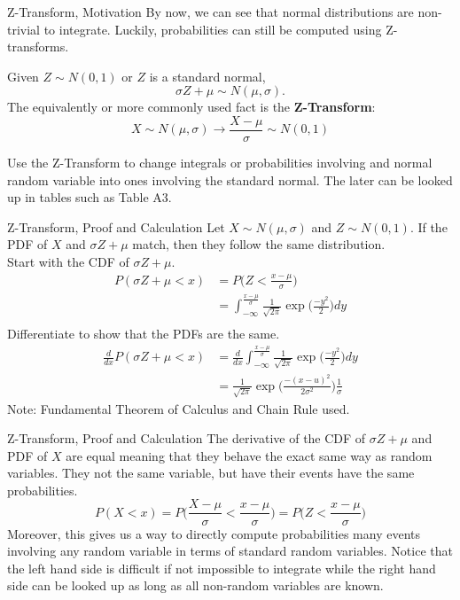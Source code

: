 \documentclass[handout]{beamer}
\newcommand{\nl}[1]{\vspace{#1 em}}
\begin{document}
\begin{frame}{Z-Transform, Motivation}
    By now, we can see that normal distributions are non-trivial to integrate. Luckily, probabilities can still be computed using Z-transforms.
    \begin{block}{}
        Given $Z \sim N(0,1)$ or $Z$ is a standard normal,
        $$\sigma Z + \mu  \sim N(\mu,\sigma).$$
        The equivalently or more commonly used fact is the \textbf{Z-Transform}:
        $$ X\sim N(\mu,\sigma) \to \frac{X-\mu}{\sigma} \sim N(0,1) $$
    \end{block}
    Use the Z-Transform to change integrals or probabilities involving and normal random variable into ones involving the standard normal. The later can be looked up in tables such as Table A3.
\end{frame}
\begin{frame}{Z-Transform, Proof and Calculation}
    Let $X \sim N(\mu,\sigma)$ and $Z\sim N(0,1)$. If the PDF of $X$ and $\sigma Z + \mu$ match, then they follow the same distribution.\\ \nl{0.5}
    Start with the CDF of $\sigma Z + \mu$.
\begin{align*} 
    P(\sigma Z + \mu < x)  & = P\bigg(Z < \frac{x-\mu}{\sigma}\bigg) \\
    &= \int_{-\infty}^{\frac{x-\mu}{\sigma}} \frac{1}{\sqrt{2 \pi}} \exp \bigg( \frac{-y^2}{2}\bigg) dy\\
\end{align*}
\pause Differentiate to show that the PDFs are the same.
\pause \begin{align*} 
    \frac{d}{dx}P(\sigma Z + \mu < x)  & = \frac{d}{dx}\int_{-\infty}^{\frac{x-\mu}{\sigma}} \frac{1}{\sqrt{2 \pi}} \exp \bigg( \frac{-y^2}{2}\bigg) dy\\
    & = \frac{1}{\sqrt{2 \pi}} \exp \bigg( \frac{-(x-u)^2}{2\sigma^2}\bigg) \frac{1}{\sigma}
\end{align*}
Note: Fundamental Theorem of Calculus and Chain Rule used.
\end{frame}
\begin{frame}{Z-Transform, Proof and Calculation}
    The derivative of the CDF of $\sigma Z + \mu$ and PDF of $X$ are equal meaning that they behave the exact same way as random variables. They not the same variable, but have their events have the same probabilities.
    $$ P(X<x) = P\bigg(\frac{X-\mu}{\sigma}< \frac{x-\mu}{\sigma}\bigg) = P\bigg(Z< \frac{x-\mu}{\sigma}\bigg)$$
    \pause Moreover, this gives us a way to directly compute probabilities many events involving any random variable in terms of standard random variables.
    \nl{0.5}
    Notice that the left hand side is difficult if not impossible to integrate while the right hand side can be looked up as long as all non-random variables are known.
\end{frame}
\end{document}
